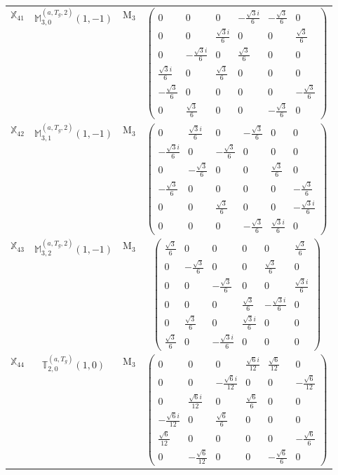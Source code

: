 \documentclass[fleqn,10pt,landscape]{article}
\begin{document}
\begin{itemize}
\begin{center}
\begin{longtable}{c|c|c|c}
$ \mathbb{X}_{41} $ & $\mathbb{M}_{3,0}^{(a,T_{g},2)}(1,-1)$ & M$_{3}$ & $\begin{pmatrix} 0 & 0 & 0 & - \frac{\sqrt{3} i}{6} & - \frac{\sqrt{3}}{6} & 0 \\ 0 & 0 & \frac{\sqrt{3} i}{6} & 0 & 0 & \frac{\sqrt{3}}{6} \\ 0 & - \frac{\sqrt{3} i}{6} & 0 & \frac{\sqrt{3}}{6} & 0 & 0 \\ \frac{\sqrt{3} i}{6} & 0 & \frac{\sqrt{3}}{6} & 0 & 0 & 0 \\ - \frac{\sqrt{3}}{6} & 0 & 0 & 0 & 0 & - \frac{\sqrt{3}}{6} \\ 0 & \frac{\sqrt{3}}{6} & 0 & 0 & - \frac{\sqrt{3}}{6} & 0 \end{pmatrix}$ \\
$ \mathbb{X}_{42} $ & $\mathbb{M}_{3,1}^{(a,T_{g},2)}(1,-1)$ & M$_{3}$ & $\begin{pmatrix} 0 & \frac{\sqrt{3} i}{6} & 0 & - \frac{\sqrt{3}}{6} & 0 & 0 \\ - \frac{\sqrt{3} i}{6} & 0 & - \frac{\sqrt{3}}{6} & 0 & 0 & 0 \\ 0 & - \frac{\sqrt{3}}{6} & 0 & 0 & \frac{\sqrt{3}}{6} & 0 \\ - \frac{\sqrt{3}}{6} & 0 & 0 & 0 & 0 & - \frac{\sqrt{3}}{6} \\ 0 & 0 & \frac{\sqrt{3}}{6} & 0 & 0 & - \frac{\sqrt{3} i}{6} \\ 0 & 0 & 0 & - \frac{\sqrt{3}}{6} & \frac{\sqrt{3} i}{6} & 0 \end{pmatrix}$ \\
$ \mathbb{X}_{43} $ & $\mathbb{M}_{3,2}^{(a,T_{g},2)}(1,-1)$ & M$_{3}$ & $\begin{pmatrix} \frac{\sqrt{3}}{6} & 0 & 0 & 0 & 0 & \frac{\sqrt{3}}{6} \\ 0 & - \frac{\sqrt{3}}{6} & 0 & 0 & \frac{\sqrt{3}}{6} & 0 \\ 0 & 0 & - \frac{\sqrt{3}}{6} & 0 & 0 & \frac{\sqrt{3} i}{6} \\ 0 & 0 & 0 & \frac{\sqrt{3}}{6} & - \frac{\sqrt{3} i}{6} & 0 \\ 0 & \frac{\sqrt{3}}{6} & 0 & \frac{\sqrt{3} i}{6} & 0 & 0 \\ \frac{\sqrt{3}}{6} & 0 & - \frac{\sqrt{3} i}{6} & 0 & 0 & 0 \end{pmatrix}$ \\
$ \mathbb{X}_{44} $ & $\mathbb{T}_{2,0}^{(a,T_{g})}(1,0)$ & M$_{3}$ & $\begin{pmatrix} 0 & 0 & 0 & \frac{\sqrt{6} i}{12} & \frac{\sqrt{6}}{12} & 0 \\ 0 & 0 & - \frac{\sqrt{6} i}{12} & 0 & 0 & - \frac{\sqrt{6}}{12} \\ 0 & \frac{\sqrt{6} i}{12} & 0 & \frac{\sqrt{6}}{6} & 0 & 0 \\ - \frac{\sqrt{6} i}{12} & 0 & \frac{\sqrt{6}}{6} & 0 & 0 & 0 \\ \frac{\sqrt{6}}{12} & 0 & 0 & 0 & 0 & - \frac{\sqrt{6}}{6} \\ 0 & - \frac{\sqrt{6}}{12} & 0 & 0 & - \frac{\sqrt{6}}{6} & 0 \end{pmatrix}$ \\

\end{longtable}
\end{center}
\end{itemize}
\end{document}
